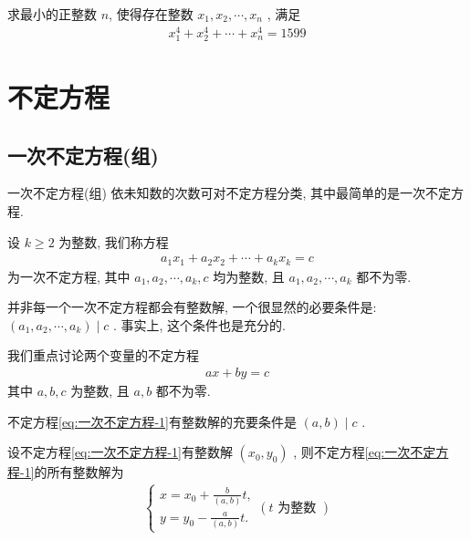 \documentclass[aspectratio=169]{ctexbeamer}
\theoremstyle{definition}
\begin{document}
\begin{frame}[t]
	\begin{example}
		求最小的正整数 $n$, 使得存在整数 $x_{1}, x_{2}, \cdots, x_{n}$ , 满足
		\begin{align*}
			x_{1}^{4}+x_{2}^{4}+\cdots+x_{n}^{4}=1599
		\end{align*}
	\end{example}
\end{frame}


\section{不定方程}
\subsection{一次不定方程(组)}
\setcounter{theorem}{0}
\begin{frame}{一次不定方程(组)}
	依未知数的次数可对不定方程分类, 其中最简单的是一次不定方程.

	设 $k \geqslant 2$ 为整数, 我们称方程
	\begin{align*}
		a_{1} x_{1}+a_{2} x_{2}+\cdots+a_{k} x_{k}=c
	\end{align*}
	为一次不定方程, 其中 $a_{1} ,  a_{2} ,  \cdots ,  a_{k} ,  c$ 均为整数, 且 $a_{1} ,  a_{2} ,  \cdots ,  a_{k}$ 都不为零.

	并非每一个一次不定方程都会有整数解, 一个很显然的必要条件是:  $\left(a_{1}, a_{2}, \cdots, a_{k}\right) \mid c$ . 事实上, 这个条件也是充分的.

	我们重点讨论两个变量的不定方程
	\begin{align}\label{eq:一次不定方程-1}
		a x+b y=c
	\end{align}
	其中 $a ,  b ,  c$ 为整数, 且 $a ,  b$ 都不为零.
\end{frame}

\begin{frame}[t]
	\begin{theorem}\label{thm:一次不定方程-1}
		不定方程\ref{eq:一次不定方程-1}有整数解的充要条件是 $(a, b) \mid c$ .
	\end{theorem}
\end{frame}

\begin{frame}[t]
	\begin{theorem}\label{thm:一次不定方程-2}
		设不定方程\ref{eq:一次不定方程-1}有整数解 $\left(x_{0}, y_{0}\right)$ , 则不定方程\ref{eq:一次不定方程-1}的所有整数解为
		\begin{align}\label{eq:一次不定方程-3}
			\left\{\begin{array}{l}
				       x=x_{0}+\frac{b}{(a, b)} t, \\
				       y=y_{0}-\frac{a}{(a, b)} t .
			       \end{array}(t \text { 为整数 })\right.
		\end{align}
	\end{theorem}
\end{frame}
\end{document}
